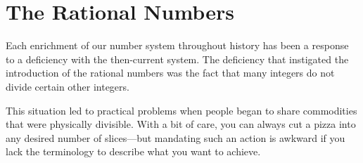 \section{The Rational Numbers}
\label{sec:rationals}

Each enrichment of our number system throughout history has been a response to a deficiency with the then-current system.  The deficiency that instigated the introduction of the rational numbers was the fact that many integers do not divide certain other integers.

This situation led to practical problems when people began to share commodities that were physically divisible.  With a bit of care, you can always cut a pizza into any desired number of slices---but mandating such an action is awkward if you lack the terminology to describe what you want to achieve.

